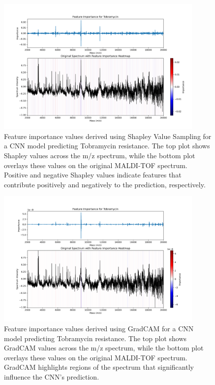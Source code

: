 \documentclass[english,11pt,a4paper,titlepage]{article}
\begin{document}
\begin{figure}[h]
	\centering
	\includegraphics[width=0.9\textwidth]{img/Tobramycin_shapley.png}
	\caption{Feature importance values derived using Shapley Value Sampling for a CNN model predicting Tobramycin resistance. The top plot shows Shapley values across the m/z spectrum, while the bottom plot overlays these values on the original MALDI-TOF spectrum. Positive and negative Shapley values indicate features that contribute positively and negatively to the prediction, respectively.}
	\label{fig:feature_shapley}
\end{figure}
\begin{figure}[h]
	\centering
	\includegraphics[width=0.9\textwidth]{img/Tobramycin_gradcam.png}
	\caption{Feature importance values derived using GradCAM for a CNN model predicting Tobramycin resistance. The top plot shows GradCAM values across the m/z spectrum, while the bottom plot overlays these values on the original MALDI-TOF spectrum. GradCAM highlights regions of the spectrum that significantly influence the CNN's prediction.}
	\label{fig:feature_gradcam}
\end{figure}
\clearpage
\end{document}
